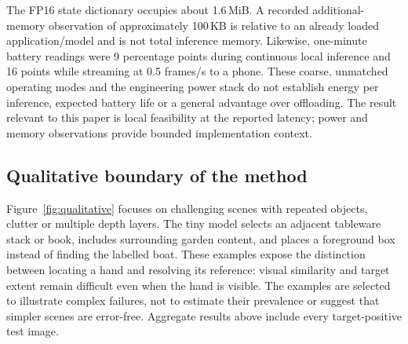The FP16 state dictionary occupies about 1.6\,MiB. A recorded additional-memory observation of approximately 100\,KB is relative to an already loaded application/model and is not total inference memory. Likewise, one-minute battery readings were 9 percentage points during continuous local inference and 16 points while streaming at 0.5 frames/s to a phone. These coarse, unmatched operating modes and the engineering power stack do not establish energy per inference, expected battery life or a general advantage over offloading. The result relevant to this paper is local feasibility at the reported latency; power and memory observations provide bounded implementation context.

\subsection{Qualitative boundary of the method}
Figure~\ref{fig:qualitative} focuses on challenging scenes with repeated objects, clutter or multiple depth layers. The tiny model selects an adjacent tableware stack or book, includes surrounding garden content, and places a foreground box instead of finding the labelled boat. These examples expose the distinction between locating a hand and resolving its reference: visual similarity and target extent remain difficult even when the hand is visible. The examples are selected to illustrate complex failures, not to estimate their prevalence or suggest that simpler scenes are error-free. Aggregate results above include every target-positive test image.


